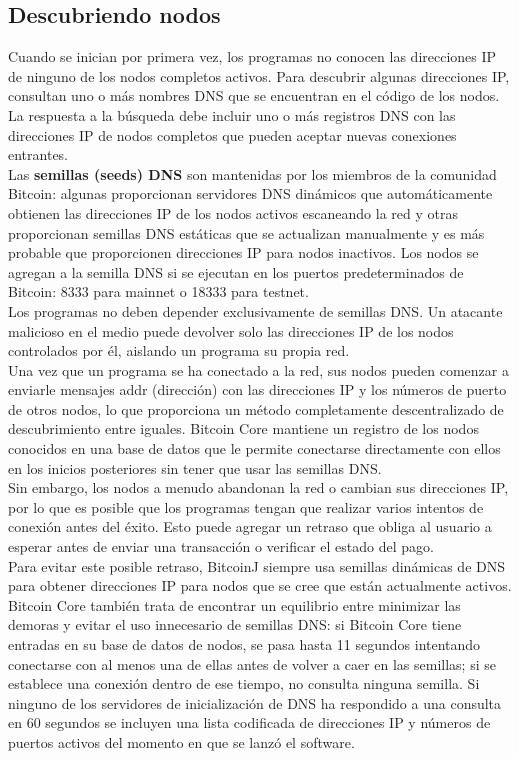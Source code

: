 \documentclass[11pt,a4paper]{article}
\begin{document}
\subsection{Descubriendo nodos}

Cuando se inician por primera vez, los programas no conocen las direcciones IP de ninguno de los nodos completos activos. Para descubrir algunas direcciones IP, consultan uno o más nombres DNS que se encuentran en el código de los nodos. La respuesta a la búsqueda debe incluir uno o más registros DNS con las direcciones IP de nodos completos que pueden aceptar nuevas conexiones entrantes.\\

Las \textbf{semillas (seeds) DNS} son mantenidas por los miembros de la comunidad Bitcoin: algunas proporcionan servidores DNS dinámicos que automáticamente obtienen las direcciones IP de los nodos activos escaneando la red y otras proporcionan semillas DNS estáticas que se actualizan manualmente y es más probable que proporcionen direcciones IP para nodos inactivos. Los nodos se agregan a la semilla DNS si se ejecutan en los puertos predeterminados de Bitcoin: 8333 para mainnet o 18333 para testnet.\\

Los programas no deben depender exclusivamente de semillas DNS. Un atacante malicioso en el medio puede devolver solo las direcciones IP de los nodos controlados por él, aislando un programa su propia red.\\

Una vez que un programa se ha conectado a la red, sus nodos pueden comenzar a enviarle mensajes addr (dirección) con las direcciones IP y los números de puerto de otros nodos, lo que proporciona un método completamente descentralizado de descubrimiento entre iguales. Bitcoin Core mantiene un registro de los nodos conocidos en una base de datos que le permite conectarse directamente con ellos en los inicios posteriores sin tener que usar las semillas DNS.\\

Sin embargo, los nodos a menudo abandonan la red o cambian sus direcciones IP, por lo que es posible que los programas tengan que realizar varios intentos de conexión antes del éxito. Esto puede agregar un retraso que obliga al usuario a esperar antes de enviar una transacción o verificar el estado del pago.\\

Para evitar este posible retraso, BitcoinJ siempre usa semillas dinámicas de DNS para obtener direcciones IP para nodos que se cree que están actualmente activos. Bitcoin Core también trata de encontrar un equilibrio entre minimizar las demoras y evitar el uso innecesario de semillas DNS: si Bitcoin Core tiene entradas en su base de datos de nodos, se pasa hasta 11 segundos intentando conectarse con al menos una de ellas antes de volver a caer en las semillas; si se establece una conexión dentro de ese tiempo, no consulta ninguna semilla. Si ninguno de los servidores de inicialización de DNS ha respondido a una consulta en 60 segundos se incluyen una lista codificada de direcciones IP y números de puertos activos del momento en que se lanzó el software.\\
\end{document}
